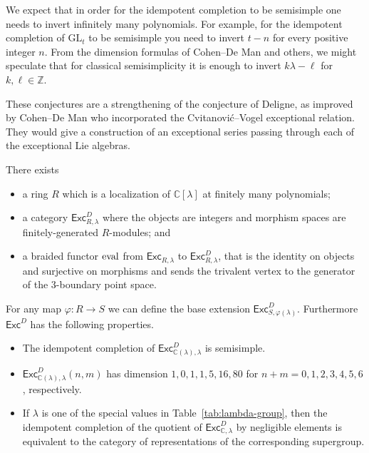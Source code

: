 \documentclass[12pt]{amsart}
\begin{document}
We expect that in order for the idempotent completion to be semisimple one
needs to invert infinitely many polynomials.  For example, for the idempotent
completion of $\mathrm{GL}_t$ to be semisimple you need to invert $t-n$ for
every positive integer $n$.  From the dimension formulas of Cohen--De Man and
others, we might speculate that for classical semisimplicity it is
enough to invert $k\lambda-\ell$ for $k, \ell \in \mathbb{Z}$.

These conjectures are a strengthening of the conjecture of Deligne, as
improved by Cohen--De Man who incorporated the Cvitanović--Vogel exceptional
relation. They would give a construction of an exceptional series passing
through each of the exceptional Lie algebras.

\begin{conjecture}\label{conj:Deligne}
There exists
  \begin{itemize}
  \item a ring $R$ which is a localization of $\mathbb{C}[\lambda]$ at finitely many polynomials;
  \item a category $\mathsf{Exc}^D_{R,\lambda}$ where the objects are
    integers and morphism spaces are finitely-generated $R$-modules; and
  \item a braided functor $\operatorname{eval}$ from $\mathsf{Exc}_{R,\lambda}$ to $\mathsf{Exc}^D_{R,\lambda}$, that is the identity on objects and surjective on morphisms and sends the trivalent vertex to the generator of the $3$-boundary point space.
  \end{itemize}
For any map $\varphi: R \rightarrow S$ we can define the base extension $\mathsf{Exc}^D_{S,\varphi(\lambda)}$.  Furthermore $\mathsf{Exc}^D$ has the following properties.
\begin{itemize}
\item The idempotent completion of $\mathsf{Exc}^D_{\mathbb{C}(\lambda),\lambda}$ is semisimple.
\item $\mathsf{Exc}^D_{\mathbb{C}(\lambda),\lambda}(n,m)$ has dimension $1,\allowbreak0,\allowbreak1,\allowbreak1,\allowbreak5,\allowbreak16,\allowbreak80$
for $n+m=0,1,2,3,4,5,6$, respectively.
\item If $\lambda$ is one of the special values in
  Table~\ref{tab:lambda-group}, then the idempotent completion of the
  quotient of
  $\mathsf{Exc}^D_{\mathbb{C},\lambda}$ by negligible elements is
  equivalent to the category of representations of the corresponding
  supergroup.
\end{itemize}
\end{conjecture}
\end{document}
